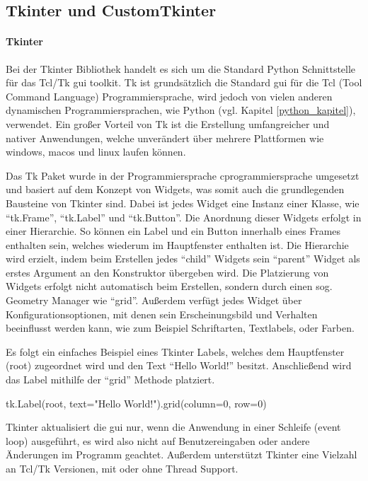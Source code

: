 \subsection{Tkinter und CustomTkinter}\label{tkinter_kapitel}
\paragraph{Tkinter}
Bei der Tkinter Bibliothek handelt es sich um die Standard Python Schnittstelle für das Tcl/Tk \ac{gui} toolkit. Tk ist grundsätzlich die Standard \acs{gui} für die Tcl (Tool Command Language) Programmiersprache, wird jedoch von vielen anderen dynamischen Programmiersprachen, wie \zB Python (vgl. Kapitel \ref{python_kapitel}), verwendet. Ein großer Vorteil von Tk ist die Erstellung umfangreicher und nativer Anwendungen, welche unverändert über mehrere Plattformen wie windows, macos und linux laufen können. \cite[vgl.][]{Python_Software_Foundation_Tk:o.J., Tcl_Developer_Xchange:o.J.}

Das Tk Paket wurde in der Programmiersprache cprogrammiersprache umgesetzt und basiert auf dem Konzept von Widgets, was somit auch die grundlegenden Bausteine von Tkinter sind. Dabei ist jedes Widget eine Instanz einer Klasse, wie \zB \enquote{tk.Frame}, \enquote{tk.Label} und \enquote{tk.Button}. Die Anordnung dieser Widgets erfolgt in einer Hierarchie. So können \zB ein Label und ein Button innerhalb eines Frames enthalten sein, welches wiederum im Hauptfenster enthalten ist. Die Hierarchie wird erzielt, indem beim Erstellen jedes \enquote{child} Widgets sein \enquote{parent} Widget als erstes Argument an den Konstruktor übergeben wird. Die Platzierung von Widgets erfolgt nicht automatisch beim Erstellen, sondern durch einen sog. Geometry Manager wie \enquote{grid}. Außerdem verfügt jedes Widget über Konfigurationsoptionen, mit denen sein Erscheinungsbild und Verhalten beeinflusst werden kann, wie zum Beispiel Schriftarten, Textlabels, oder Farben. \cite[vgl.][]{Python_Software_Foundation_Tk:o.J., Shipman:2013}

Es folgt ein einfaches Beispiel eines Tkinter Labels, welches dem Hauptfenster (root) zugeordnet wird und den Text \enquote{Hello World!} besitzt. Anschließend wird das Label mithilfe der \enquote{grid} Methode platziert. 
\begin{pythoncode}
tk.Label(root, text="Hello World!").grid(column=0, row=0)
\end{pythoncode}

Tkinter aktualisiert die \acs{gui} nur, wenn die Anwendung in einer Schleife (event loop) ausgeführt, es wird also nicht auf Benutzereingaben oder andere Änderungen im Programm geachtet. Außerdem unterstützt Tkinter eine Vielzahl an Tcl/Tk Versionen, mit oder ohne Thread Support. \cite[vgl.][]{Python_Software_Foundation_Tk:o.J.}

